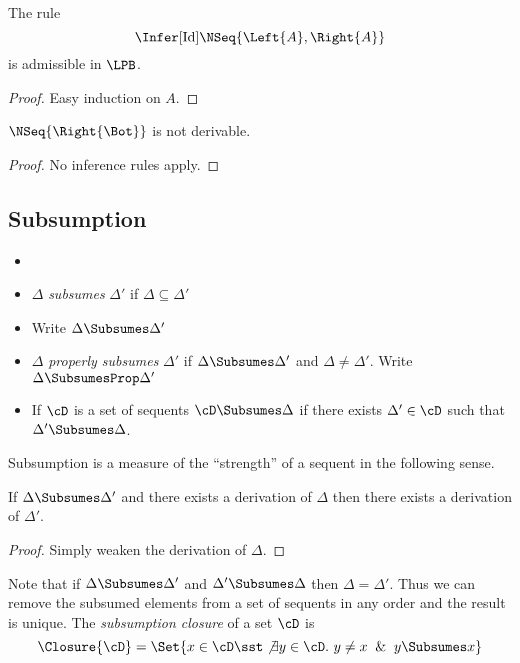 \begin{theorem}[Identity]
  The rule \[\Infer[\mbox{Id}]{\NSeq{\Left{A},\Right{A}}}{}\]
  is admissible in $\LPB$.
\end{theorem}
\begin{proof} Easy induction on $A$. \end{proof}

\begin{theorem}[Consistency]
  \label{prop.thm.consistent}
  $\NSeq{\Right{\Bot}}$ is not derivable.
\end{theorem}
\begin{proof} No inference rules apply. \end{proof}

\subsection{Subsumption}

\begin{definition}[Subsumption]
  \begin{itemize}
  \item[]
  \item $\Delta$ \emph{subsumes} $\Delta'$
    if $\Delta\subseteq\Delta'$
  \item Write $\Delta\Subsumes\Delta'$
  \item $\Delta$ \emph{properly subsumes} $\Delta'$ if
    $\Delta\Subsumes \Delta'$
    and $\Delta\neq \Delta'$.  Write $\Delta\SubsumesProp \Delta'$
  \item If $\cD$ is a set of sequents $\cD\Subsumes \Delta$ if
    there exists $\Delta'\in\cD$ such that $\Delta'\Subsumes \Delta$.
  \end{itemize}
\end{definition}

\noindent
Subsumption is a measure of the ``strength'' of a sequent
in the following sense.

\begin{theorem}
  \label{prop.thm.subs}
  If $\Delta\Subsumes \Delta'$ and there exists a
  derivation of $\Delta$ then there exists a derivation of
  $\Delta'$.
\end{theorem}
\begin{proof} Simply weaken the derivation of $\Delta$. \end{proof}

\begin{definition}
  Note that if $\Delta\Subsumes \Delta'$ and $\Delta'\Subsumes \Delta$ then
  $\Delta = \Delta'$.  Thus we can remove the subsumed elements from a set of
  sequents in any order and the result is unique.
  The \emph{subsumption closure} of a set
  $\cD$ is
  \[
  \Closure{\cD} = \Set{x\in\cD \sst \not\exists y\in\cD.\ y\neq x\And y\Subsumes x}
  \]
\end{definition}

